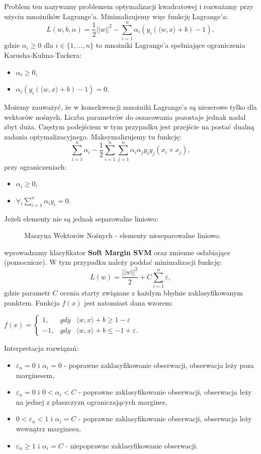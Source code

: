 \documentclass[12pt,a4paper]{report}
\begin{document}
Problem ten nazywamy problemem optymalizacji kwadratowej i rozważamy przy użyciu mnożników Lagrange'a. Minimalizujemy więc funkcję Lagrange'a:
$$L(w,b,\alpha)=\frac{1}{2}||w||^2 - \sum_{i=1}^n \alpha_i(y_i(\langle w,x \rangle + b)-1),$$
gdzie
$\alpha_i \geq 0$ dla $i \in \{1,...,n\}$ to mnożniki Lagrange'a spełniające ograniczenia Karusha-Kuhna-Tuckera:
\begin{itemize}
\item $\alpha_i \geq 0$,
\item $\alpha_i(y_i(\langle w,x \rangle + b)-1) = 0$.
\end{itemize}
Możemy zauważyć, że w konsekwencji mnożniki Lagrange'a są niezerowe tylko dla wektorów nośnych. Liczba parametrów do oszacowania pozostaje jednak nadal zbyt duża. Częstym podejściem w tym przypadku jest przejście na postać dualną zadania optymalizacyjnego.
Maksymalizujemy tu funkcję:
$$\sum_{i=1}^n \alpha_i - \frac{1}{2} \sum_{i=1}^n \sum_{j=1}^{n} \alpha_i \alpha_j y_i y_j(x_i \times x_j),$$
przy ograniczeniach:
\begin{itemize}
\item $\alpha_i \geq 0$,
\item $\forall_i \sum_{i=1}^n \alpha_i y_i =0$.
\end{itemize}
\bigskip
\bigskip
\bigskip
Jeżeli elementy nie są jednak separowalne liniowo:
\begin{center}
\begin{figure}[H]
\centering
\caption{Maszyna Wektorów Nośnych - elementy nieseparowalne liniowo.}
\end{figure}
\end{center}
wprowadzamy klasyfikator \textbf{Soft Margin SVM} oraz zmienne osłabiające (pomocnicze).
W tym przypadku należy poddać minimalizacji funkcję:
$$L(w) = \frac{||w||^2}{2} + C \sum_{i=1}^n \varepsilon,$$
gdzie parametr $C$ ocenia starty związane z każdym błędnie zaklasyfikowanym punktem.
Funkcja $f(x)$ jest natomiast dana wzorem:
\begin{center}
$f(x) = 
\left\{\begin{array}{lll}
1, & gdy &   \langle w,x \rangle + b \geq 1 - \varepsilon \\
-1, &   gdy &   \langle w,x \rangle + b \leq -1 + \varepsilon.
\end{array} \right.$
\end{center}
Interpretacja rozwiązań:
\begin{itemize}
\item $\varepsilon_n =0$ i $\alpha_i =0$ - poprawne zaklasyfikowanie obserwacji, obserwacja leży poza marginesem,
\item $\varepsilon_n =0$ i $0<\alpha_i <C$ - poprawne zaklasyfikowanie obserwacji, obserwacja leży na jednej z płaszczyzn ograniczających margines,
\item $0<\varepsilon_n <1$ i $\alpha_i =C$ - poprawne zaklasyfikowanie obserwacji, obserwacja leży wewnątrz marginesu,
\item $\varepsilon_n \geq 1$ i $\alpha_i =C$ - niepoprawne zaklasyfikowanie obserwacji.
\end{itemize}
\end{document}
